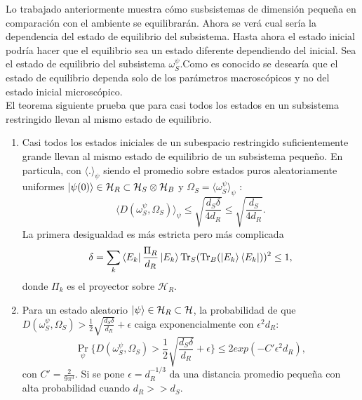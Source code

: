 Lo trabajado anteriormente muestra cómo susbsistemas de dimensión pequeña en comparación con el ambiente se equilibrarán. Ahora se verá cual sería la dependencia del estado de equilibrio del subsistema. Hasta ahora el estado inicial podría hacer que el equilibrio sea un estado diferente dependiendo del inicial. Sea el estado de equilibrio del subsistema $\omega_{S}^{\psi}$.Como es conocido se desearía que el estado de equilibrio dependa solo de los parámetros macroscópicos y no del estado inicial microscópico.
\\
El teorema siguiente prueba que para casi todos los estados en un subsistema restringido llevan al mismo estado de equilibrio.
\begin{theorem} \label{mismo estado}
\begin{enumerate}
\item Casi todos los estados iniciales de un subespacio restringido suficientemente grande llevan al mismo estado de equilibrio de un subsistema pequeño. En particula, con $\langle .\rangle_{\psi}$ siendo el promedio sobre estados puros aleatoriamente uniformes $\ket{\psi(0)} \in \mathcal{H}_{R} \subset \mathcal{H}_{S} \otimes \mathcal{H}_{B}$ y $\Omega_{S}= \langle \omega_{S}^{\psi} \rangle_{\psi}$ :
\begin{equation}
\langle D(\omega_{S}^{\psi}, \Omega_{S}) \rangle_{\psi} \leq \sqrt{\frac{d_{S} \delta}{4d_{R}}} \leq \sqrt{\frac{d_{S}}{4d_{R}}}.
\end{equation}
La primera desigualdad es más estricta pero más complicada 
\begin{equation}
\delta= \sum_{k}\bra{E_{k}}\frac{\Pi_{R}}{d_{R}}\ket{E_{k}} \Tr_{S} ( \Tr_{B} (\ket{E_{k}} \bra{E_{k}}) )^{2} \leq  1,
\end{equation}
donde $\Pi_{k}$ es el proyector sobre $\mathcal{H}_{R}$.
\item Para un estado aleatorio $\ket{\psi} \in \mathcal{H}_{R}\subset \mathcal{H}$, la probabilidad de que $D(\omega_{S}^{\psi},\Omega_{S}) > \frac{1}{2} \sqrt{\frac{d_{S} \delta}{d_{R}}}+ \epsilon$ caiga exponencialmente con $\epsilon^{2}d_{R}$:
\begin{equation}
\Pr_{\psi} \bigg \{ D(\omega_{S}^{\psi}, \Omega_{S}) > \frac{1}{2}\sqrt{\frac{d_{S} \delta}{d_{R}}} + \epsilon \bigg \} \leq 2exp(-C'\epsilon^{2}d_{R}),
\end{equation}
con $C'=\frac{2}{9 \pi^{3}}$. Si se pone $\epsilon=d_{R}^{-1/3}$ da una distancia promedio pequeña con alta probabilidad cuando $d_{R}>>d_{S}$.
\end{enumerate}
\end{theorem}
